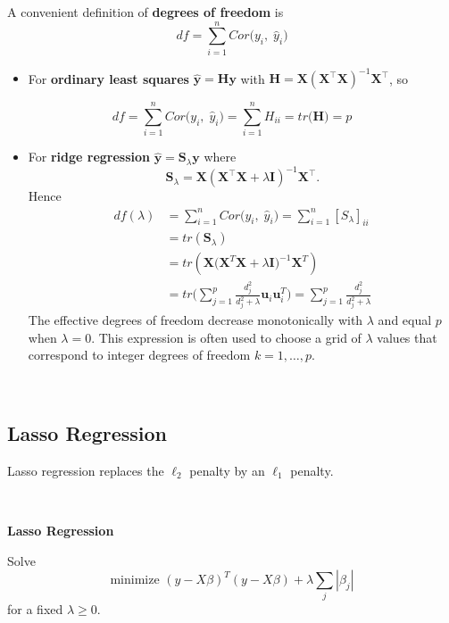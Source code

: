 \documentclass[
]{book}
\providecommand{\tightlist}{%
  \setlength{\itemsep}{0pt}\setlength{\parskip}{0pt}}
\begin{document}
A convenient definition of \textbf{degrees of freedom} is
\[df = \sum_{i=1}^{n} Cor \bigl(y_i,\; \hat{y}_i \bigr)\]

\begin{itemize}
\tightlist
\item
  For \textbf{ordinary least squares} \(\hat{\mathbf{y}}=\mathbf{H}\mathbf{y}\) with \(\mathbf{H}=\mathbf{X}(\mathbf{X}^\top\mathbf{X})^{-1}\mathbf{X}^\top\), so
\end{itemize}

\[df = \sum_{i=1}^{n} Cor \bigl(y_i,\; \hat{y}_i \bigr) = \sum_{i=1}^{n} H_{ii} = tr \bigl( \mathbf{H} \bigr) = p\]

\begin{itemize}
\tightlist
\item
  For \textbf{ridge regression} \(\hat{\mathbf{y}}=\mathbf{S}_\lambda\mathbf{y}\) where
  \[
  \mathbf{S}_\lambda=\mathbf{X}(\mathbf{X}^\top\mathbf{X}+\lambda\mathbf{I})^{-1}\mathbf{X}^\top.
  \]
  Hence
  \begin{align*}
  df(\lambda) &= \sum_{i=1}^{n} Cor \bigl(y_i,\; \hat{y}_i \bigr) = \sum_{i=1}^{n} [S_{\lambda}]_{ii}\\
  &= tr(\mathbf{S}_{\lambda}) \\
  &=  tr(\mathbf{X} \bigl(\mathbf{X}^T \mathbf{X} + \lambda \mathbf{I} \bigr)^{-1} \mathbf{X}^T)\\
  &= tr\Biggl( \sum_{j=1}^{p} \frac{d_j^2}{d_j^2 + \lambda} \mathbf{u}_i \mathbf{u}_i^T\Biggr) =  \sum_{j=1}^{p} \frac{d_j^2}{d_j^2 + \lambda}   
  \end{align*}
  The effective degrees of freedom decrease monotonically with \(\lambda\) and equal \(p\) when \(\lambda=0\). This expression is often used to choose a grid of \(\lambda\) values that correspond to integer degrees of freedom \(k=1,\dots,p\).
\end{itemize}

~

\subsection{Lasso Regression}\label{lasso-regression}

Lasso regression replaces the \(\ell_2\) penalty by an \(\ell_1\) penalty.

~

\textbf{Lasso Regression}

Solve
\[\text{minimize } (y-X \beta)^T (y-X\beta) + \lambda \sum_j |\beta_j|\]
for a fixed \(\lambda \ge 0\).
~
\end{document}
